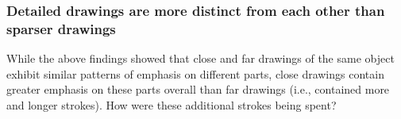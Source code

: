 \documentclass[10pt,letterpaper]{article}
\newcommand\norm[1]{\left\lVert#1\right\rVert}
\begin{document}
\vspace*{4px}



\subsubsection{Detailed drawings are more distinct from each other than sparser drawings}


While the above findings showed that close and far drawings of the same object exhibit similar patterns of emphasis on different parts, close drawings contain greater emphasis on these parts overall than far drawings (i.e., contained more and longer strokes). 
How were these additional strokes being spent? 
\end{document}
